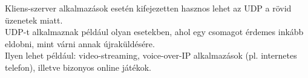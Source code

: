 \documentclass[12pt]{article}
\begin{document}
    \noindent Kliens-szerver alkalmazások esetén kifejezetten hasznos lehet az UDP a rövid üzenetek miatt. \\

    \noindent UDP-t alkalmaznak például olyan esetekben, ahol egy csomagot érdemes inkább eldobni, mint várni annak újraküldésére. \\

    \noindent Ilyen lehet például: video-streaming, voice-over-IP alkalmazások (pl. internetes telefon), illetve bizonyos online játékok.
		
\end{document}
